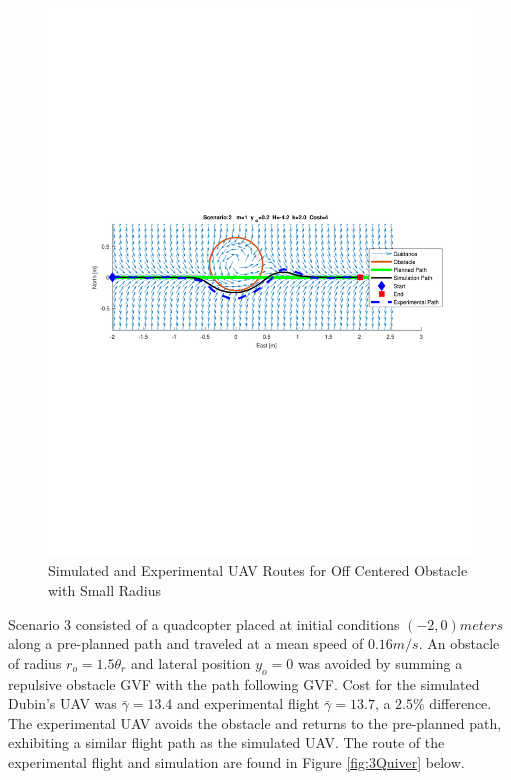 \documentclass[numbered,pdftex]{ohio-etd}
\begin{document}
\begin{figure}[H]
	\centering
	\includegraphics[trim = 50 300 0 285, clip, width=16.5cm]{Figures/results/compareFigures/2Quiver}
	\caption{Simulated and Experimental UAV Routes for Off Centered Obstacle with Small Radius}
	\label{fig:2Quiver}
	\end{figure}

Scenario 3 consisted of a quadcopter placed at initial conditions $(-2,0) meters$ along a pre-planned path and traveled at a mean speed of $0.16 m/s$. An obstacle of radius $r_o = 1.5 \theta_r$ and lateral position $y_o=0$ was avoided by summing a repulsive obstacle GVF with the path following GVF. Cost for the simulated Dubin's UAV was $\bar{\gamma} = 13.4$ and experimental flight $\bar{\gamma} = 13.7$, a $2.5 \%$ difference. The experimental UAV avoids the obstacle and returns to the pre-planned path, exhibiting a similar flight path as the simulated UAV. The route of the experimental flight and simulation are found in Figure \ref{fig:3Quiver} below. 
\end{document}
